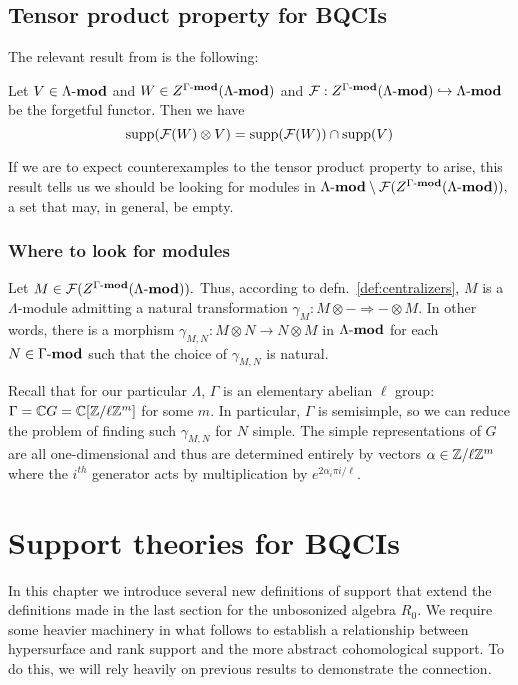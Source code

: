 \documentclass [11pt, proquest] {uwthesis}[2020/02/24]
\begin{document}
\section{Tensor product property for BQCIs}

    The relevant result from \cite{negron-pevtsovaI} is the following:
    \begin{thm}
        Let $V\in \Lambda\text{-}\mathbf{mod}$ and $W\in Z^{\Gamma\text{-}\mathbf{mod}}(\Lambda\text{-}\mathbf{mod})$ and $\mathcal{F}:Z^{\Gamma\text{-}\mathbf{mod}}(\Lambda\text{-}\mathbf{mod})\hookrightarrow\Lambda\text{-}\mathbf{mod}$ be the forgetful functor. Then we have
        \[\operatorname{supp}(\mathcal{F}(W)\otimes V)=\operatorname{supp}(\mathcal{F}(W))\cap\operatorname{supp}(V)\]
    \end{thm}
    
    
    If we are to expect counterexamples to the tensor product property to arise, this result tells us we should be looking for modules in $\Lambda\text{-}\mathbf{mod}\setminus\mathcal{F}(Z^{\Gamma\text{-}\mathbf{mod}}(\Lambda\text{-}\mathbf{mod})),$ a set that may, in general, be empty.
    

\subsection{Where to look for modules}
    Let $M\in\mathcal{F}(Z^{\Gamma\text{-}\mathbf{mod}}(\Lambda\text{-}\mathbf{mod})).$ Thus, according to defn.~\ref{def:centralizers}, $M$ is a $\Lambda$-module admitting a natural transformation $\gamma_M:M\otimes-\Rightarrow -\otimes M.$ In other words, there is a morphism $\gamma_{M,N}:M\otimes N\to N\otimes M$ in $\Lambda\text{-}\mathbf{mod}$ for each $N\in\Gamma\text{-}\mathbf{mod}$ such that the choice of $\gamma_{M,N}$ is natural.
    
    Recall that for our particular $\Lambda$, $\Gamma$ is an elementary abelian $\ell$ group: $\Gamma=\mathbb{C} G=\mathbb{C}[\mathbb{Z}/\ell\mathbb{Z}^m]$ for some $m$. In particular, $\Gamma$ is semisimple, so we can reduce the problem of finding such $\gamma_{M,N}$ for $N$ simple. The simple representations of $G$ are all one-dimensional and thus are determined entirely by vectors $\alpha\in\mathbb{Z}/\ell\mathbb{Z}^m$ where the $i^{th}$ generator acts by multiplication by $e^{2\alpha_i\pi i/\ell}.$ 





\chapter{Support theories for BQCIs}\label{chp:var-qbci}
In this chapter we introduce several new definitions of support that extend the definitions made in the last section for the unbosonized algebra $R_0$. We require some heavier machinery in what follows to establish a relationship between hypersurface and rank support and the more abstract cohomological support. To do this, we will rely heavily on previous results to demonstrate the connection.
\end{document}
